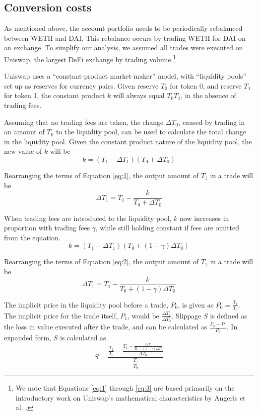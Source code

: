 \documentclass[conference]{IEEEtran}
\begin{document}
\subsection{Conversion costs}
\label{sec:conversion}
As mentioned above, the account portfolio needs to be periodically rebalanced between WETH and DAI. This rebalance occurs by trading WETH for DAI on an exchange. To simplify our analysis, we assumed all trades were executed on Uniswap, the largest DeFi exchange by trading volume.\footnote{We note that Equations \eqref{eq:1} through \eqref{eq:3} are based primarily on the introductory work on Uniswap's mathematical characteristics by Angeris et al. \cite{defiMath1}.}

Uniswap uses a ``constant-product market-maker'' model, with ``liquidity pools'' set up as reserves for currency pairs. Given reserve $T_0$ for token 0, and reserve $T_1$ for token 1, the constant product $k$ will always equal \( T_0 T_1 \), in the absence of trading fees. 

Assuming that no trading fees are taken, the change \( \Delta T_0 \), caused by trading in an amount of $T_0$ to the liquidity pool, can be used to calculate the total change in the liquidity pool. Given the constant product nature of the liquidity pool, the new value of $k$ will be
\begin{equation} \label{eq:1}
    k = (T_1 - \Delta T_1)(T_0 + \Delta T_0)
\end{equation}

Rearranging the terms of Equation \eqref{eq:1}, the output amount of $T_1$ in a trade will be 
\begin{equation}
    \Delta T_1 = T_1 - \frac{k}{T_0 + \Delta T_0}
\end{equation}

When trading fees are introduced to the liquidity pool, $k$ now increases in proportion with trading fees $\gamma$, while still holding constant if fees are omitted from the equation.
\begin{equation}
\label{eq:2}
    k = (T_1 - \Delta T_1) (T_0 + (1-\gamma) \Delta T_0)
\end{equation}

Rearranging the terms of Equation \eqref{eq:2}, the output amount of $T_1$ in a trade will be 
\begin{equation}
    \Delta T_1 = T_1 - \frac{k}{T_0 + (1-\gamma) \Delta T_0}
\end{equation}

The implicit price in the liquidity pool before a trade, $P_0$, is given as \( P_0 = \frac{T_1}{T_0} \). The implicit price for the trade itself,  $P_1$, would be \( \frac{\Delta T_1}{\Delta T_0} \). Slippage $S$ is defined as the loss in value executed after the trade, and can be calculated as $\frac{P_0 - P_1}{P_0}$. In expanded form, $S$ is calculated as
\begin{equation}
    S = \frac{\frac{T_1}{T_0} - \frac{T_1 - \frac{T_0 T_1}{T_0 + (1-\gamma) \Delta T_0}}{\Delta T_0}}{\frac{T_1}{T_0}}
\end{equation}
\end{document}
